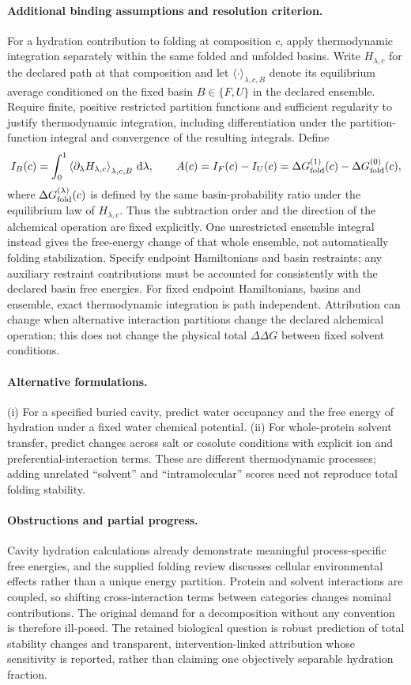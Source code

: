 \documentclass[11pt]{article}
\begin{document}
\paragraph{Additional binding assumptions and resolution criterion.} For a hydration contribution to folding at composition $c$, apply thermodynamic integration separately within the same folded and unfolded basins. Write $H_{\lambda,c}$ for the declared path at that composition and let $\langle\cdot\rangle_{\lambda,c,B}$ denote its equilibrium average conditioned on the fixed basin $B\in\{F,U\}$ in the declared ensemble. Require finite, positive restricted partition functions and sufficient regularity to justify thermodynamic integration, including differentiation under the partition-function integral and convergence of the resulting integrals. Define
\[
 I_B(c)=\int_0^1\left\langle\partial_\lambda H_{\lambda,c}\right\rangle_{\lambda,c,B}\,\mathrm{d}\lambda,
 \qquad A(c)=I_F(c)-I_U(c)
 =\Delta G_{\rm fold}^{(1)}(c)-\Delta G_{\rm fold}^{(0)}(c),
\]
where $\Delta G_{\rm fold}^{(\lambda)}(c)$ is defined by the same basin-probability ratio under the equilibrium law of $H_{\lambda,c}$. Thus the subtraction order and the direction of the alchemical operation are fixed explicitly. One unrestricted ensemble integral instead gives the free-energy change of that whole ensemble, not automatically folding stabilization. Specify endpoint Hamiltonians and basin restraints; any auxiliary restraint contributions must be accounted for consistently with the declared basin free energies. For fixed endpoint Hamiltonians, basins and ensemble, exact thermodynamic integration is path independent. Attribution can change when alternative interaction partitions change the declared alchemical operation; this does not change the physical total $\Delta\Delta G$ between fixed solvent conditions.

\paragraph{Alternative formulations.} (i) For a specified buried cavity, predict water occupancy and the free energy of hydration under a fixed water chemical potential. (ii) For whole-protein solvent transfer, predict changes across salt or cosolute conditions with explicit ion and preferential-interaction terms. These are different thermodynamic processes; adding unrelated ``solvent'' and ``intramolecular'' scores need not reproduce total folding stability.
\paragraph{Obstructions and partial progress.} Cavity hydration calculations already demonstrate meaningful process-specific free energies, and the supplied folding review discusses cellular environmental effects rather than a unique energy partition. Protein and solvent interactions are coupled, so shifting cross-interaction terms between categories changes nominal contributions. The original demand for a decomposition without any convention is therefore ill-posed. The retained biological question is robust prediction of total stability changes and transparent, intervention-linked attribution whose sensitivity is reported, rather than claiming one objectively separable hydration fraction.
\end{document}
